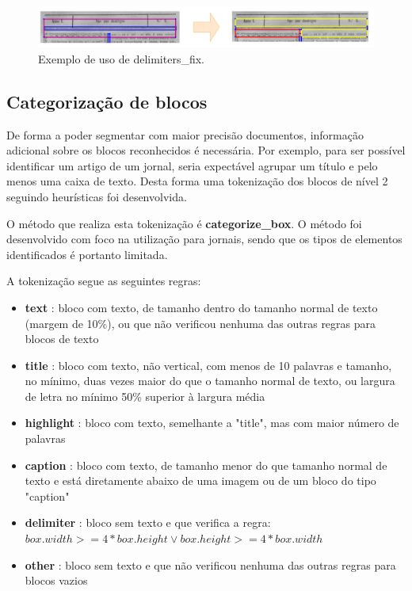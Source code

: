 \begin{figure}[H]
	\centering
	\includegraphics[width=1\textwidth]{images/ilustracoes/delimiter_fix.png}
	\caption{Exemplo de uso de delimiters\_fix.}
	\label{fig:delimiter_fix}
\end{figure}



\subsection{Categorização de blocos}
\label{contribution_categorize_blocks}

De forma a poder segmentar com maior precisão documentos, informação adicional sobre os blocos reconhecidos é necessária. Por exemplo, para ser possível identificar um artigo de um jornal, seria expectável agrupar um título e pelo menos uma caixa de texto. Desta forma uma tokenização dos blocos de nível 2 seguindo heurísticas foi desenvolvida.

O método que realiza esta tokenização é \textbf{categorize\_box}. O método foi desenvolvido com foco na utilização para jornais, sendo que os tipos de elementos identificados é portanto limitada.

A tokenização segue as seguintes regras:

\begin{itemize}\setlength\itemsep{-0.3em}
	\item \textbf{text} 		: bloco com texto, de tamanho dentro do tamanho normal de texto (margem de 10\%), ou que não verificou nenhuma das outras regras para blocos de texto
	\item \textbf{title} 	: bloco com texto, não vertical, com menos de 10 palavras e tamanho, no mínimo, duas vezes maior do que o tamanho normal de texto, ou largura de letra no mínimo 50\% superior à largura média
	\item \textbf{highlight} : bloco com texto, semelhante a "title", mas com maior número de palavras
	\item \textbf{caption} 	: bloco com texto, de tamanho menor do que tamanho normal de texto e está diretamente abaixo de uma imagem ou de um bloco do tipo "caption"
	\item \textbf{delimiter} : bloco sem texto e que verifica a regra: $box.width >= 4*box.height \vee box.height >= 4*box.width$
	\item \textbf{other} 	: bloco sem texto e que não verificou nenhuma das outras regras para blocos vazios
\end{itemize}

